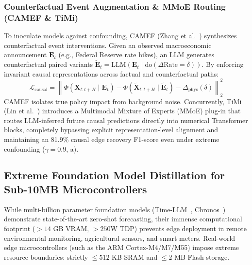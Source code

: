 \subsubsection{Counterfactual Event Augmentation \& MMoE Routing (CAMEF \& TiMi)}
To inoculate models against confounding, CAMEF (Zhang et al.~\cite{Zhang2025CAMEF}) synthesizes counterfactual event interventions. Given an observed macroeconomic announcement $\mathbf{E}_t$ (e.g., Federal Reserve rate hikes), an LLM generates counterfactual paired variants $\tilde{\mathbf{E}}_t = \text{LLM}(\mathbf{E}_t \mid \text{do}(\Delta \text{Rate} = \delta))$. By enforcing invariant causal representations across factual and counterfactual paths:
\begin{equation}
    \mathcal{L}_{\text{causal}} = \left\| \Phi(\mathbf{X}_{t:t+H} \mid \mathbf{E}_t) - \Phi(\tilde{\mathbf{X}}_{t:t+H} \mid \tilde{\mathbf{E}}_t) - \Delta_{\text{phys}}(\delta) \right\|_2^2
\end{equation}
CAMEF isolates true policy impact from background noise. Concurrently, TiMi (Lin et al.~\cite{Lin2026TiMi}) introduces a Multimodal Mixture of Experts (MMoE) plug-in that routes LLM-inferred future causal predictions directly into numerical Transformer blocks, completely bypassing explicit representation-level alignment and maintaining an 81.9\% causal edge recovery F1-score even under extreme confounding ($\gamma=0.9$, a).

\subsection{Extreme Foundation Model Distillation for Sub-10MB Microcontrollers}
\label{sec:edge_distillation}
While multi-billion parameter foundation models (Time-LLM~\cite{Jin2023TimeLLM}, Chronos~\cite{Ansari2024Chronos}) demonstrate state-of-the-art zero-shot forecasting, their immense computational footprint ($>14$ GB VRAM, $>250$W TDP) prevents edge deployment in remote environmental monitoring, agricultural sensors, and smart meters. Real-world edge microcontrollers (such as the ARM Cortex-M4/M7/M55) impose extreme resource boundaries: strictly $\le 512$ KB SRAM and $\le 2$ MB Flash storage.


